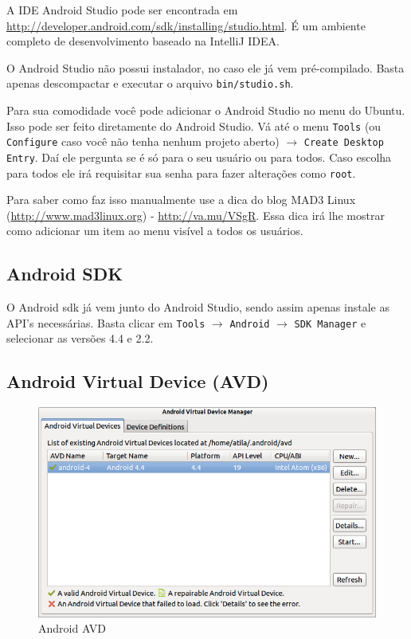 A IDE Android Studio pode ser encontrada em
\url{http://developer.android.com/sdk/installing/studio.html}. É um
ambiente completo de desenvolvimento baseado na IntelliJ IDEA.

O Android Studio não possui instalador, no caso ele já vem
pré-compilado. Basta apenas descompactar e executar o arquivo
\texttt{bin/studio.sh}.

Para sua comodidade você pode adicionar o Android Studio no menu do
Ubuntu. Isso pode ser feito diretamente do Android Studio. Vá até o menu
\texttt{Tools} (ou \texttt{Configure} caso você não tenha nenhum projeto
aberto) $\rightarrow$ \texttt{Create Desktop Entry}. Daí ele pergunta se
é só para o seu usuário ou para todos. Caso escolha para todos ele irá
requisitar sua senha para fazer alterações como \texttt{root}.

Para saber como faz isso manualmente use a dica do blog MAD3 Linux
(\url{http://www.mad3linux.org}) - \url{http://va.mu/VSgR}. Essa dica
irá lhe mostrar como adicionar um item ao menu visível a todos os
usuários.

\subsection{Android SDK \label{ssec:sdk}}

O Android \gls{sdk} já vem junto do Android Studio, sendo assim apenas
instale as API's necessárias. Basta clicar em \texttt{Tools}
$\rightarrow$ \texttt{Android} $\rightarrow$ \texttt{SDK Manager} e
selecionar as versões 4.4 e 2.2.

\subsection{Android Virtual Device (AVD)}

\begin{figure}[h]
    \includegraphics[scale=0.5]{img/preparando-ambiente/android-avd.png}
    \caption{Android AVD}
\end{figure}

